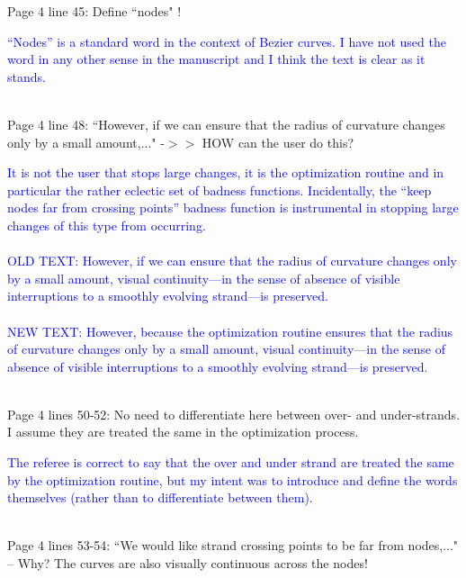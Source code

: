 \documentclass[12pt]{article}
\begin{document}
Page 4 line 45: Define ``nodes" !

\textcolor{blue}{``Nodes'' is a standard word in the context of Bezier
  curves. I have not used the word in any other sense in the
  manuscript and I think the text is clear as it stands.\\ \\}

Page 4 line 48: ``However, if we can ensure that the radius of
curvature changes only by a small amount,..."  -$>>$ HOW can the user do
this?

\textcolor{blue}{It is not the user that stops large changes, it is
  the optimization routine and in particular the rather eclectic set
  of badness functions.  Incidentally, the ``keep nodes far from
  crossing points'' badness function is instrumental in stopping large
  changes of this type from occurring.\\ \\ OLD TEXT: However, if we
  can ensure that the radius of curvature changes only by a small
  amount, visual continuity---in the sense of absence of visible
  interruptions to a smoothly evolving strand---is
  preserved. \\ \\ NEW TEXT: However, because the optimization routine
  ensures that the radius of curvature changes only by a small
  amount, visual continuity---in the sense of absence of visible
  interruptions to a smoothly evolving strand---is
  preserved.\\ \\
}

Page 4 lines 50-52: No need to differentiate here between over- and
under-strands.  I assume they are treated the same in the optimization
process.

\textcolor{blue}{The referee is correct to say that the over and under
  strand are treated the same by the optimization routine, but my
  intent was to introduce and define the words themselves (rather than
  to differentiate between them).\\ \\}

Page 4 lines 53-54: ``We would like strand crossing points to be far
from nodes,..."  -- Why?  The curves are also visually continuous across
the nodes!
\end{document}
